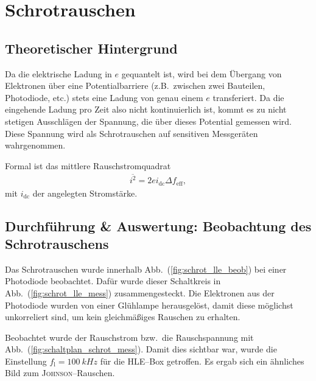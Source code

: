 \documentclass[sn-mathphys-num,iicol]{sn-jnl}
\theoremstyle{thmstyleone}
\theoremstyle{thmstyletwo}
\theoremstyle{thmstylethree}
\begin{document}
\section{Schrotrauschen}
\subsection{Theoretischer Hintergrund}
Da die elektrische Ladung in $e$ gequantelt ist, wird bei dem Übergang von Elektronen über eine Potentialbarriere (z.B.\ zwischen zwei Bauteilen, Photodiode, etc.) stets eine Ladung von genau einem $e$ transferiert.
Da die eingehende Ladung pro Zeit also nicht kontinuierlich ist, kommt es zu nicht stetigen Ausschlägen der Spannung, die über dieses Potential gemessen wird.
Diese Spannung wird als Schrotrauschen auf sensitiven Messgeräten wahrgenommen.

Formal ist das mittlere Rauschstromquadrat
\begin{align}
	\overline{i^2}=2ei_\text{dc}\Delta f_\text{eff}
	,\end{align}
mit $i_\text{dc}$ der angelegten Stromstärke.

\subsection{Durchführung \& Auswertung: Beobachtung des Schrotrauschens}
Das Schrotrauschen wurde innerhalb Abb.\ (\ref{fig:schrot_lle_beob}) bei einer Photodiode beobachtet.
Dafür wurde dieser Schaltkreis in Abb.\ (\ref{fig:schrot_lle_mess}) zusammengesteckt.
Die Elektronen aus der Photodiode wurden von einer Glühlampe herausgelöst, damit diese möglichst unkorreliert sind, um kein gleichmäßiges Rauschen zu erhalten.

Beobachtet wurde der Rauschstrom bzw.\ die Rauschspannung mit Abb.\ (\ref{fig:schaltplan_schrot_mess}).
Damit dies sichtbar war, wurde die Einstellung $f_\text{l}=\SI{100}{kHz}$ für die HLE--Box getroffen. %
Es ergab sich ein ähnliches Bild zum \textsc{Johnson}--Rauschen. %
\end{document}
